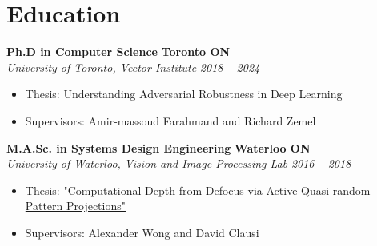\section*{Education}
\vspace{\postsubhead}
    \textbf{Ph.D in Computer Science}
    \hfill
    \textbf{Toronto ON}\\
    \textit{University of Toronto, Vector Institute}
    \hfill
    \textit{2018 -- 2024}
    \begin{itemize}
        \item Thesis: Understanding Adversarial Robustness in Deep Learning
        \item Supervisors: Amir-massoud Farahmand and Richard Zemel
    \end{itemize}
    \vspace{\interlist}
    
    \textbf{M.A.Sc. in Systems Design Engineering}
    \hfill
    \textbf{Waterloo ON}\\
    \textit{University of Waterloo, Vision and Image Processing Lab}
    \hfill
    \textit{2016 -- 2018}
    \begin{itemize}
        \item Thesis: \href{https://uwspace.uwaterloo.ca/handle/10012/13645}{"Computational Depth from Defocus via Active Quasi-random Pattern Projections"}
        \item Supervisors: Alexander Wong and David Clausi
    \end{itemize}
    \vspace{\interlist}

